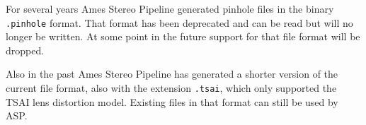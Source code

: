 For several years Ames Stereo Pipeline generated pinhole files in the binary \texttt{.pinhole} format.
That format has been deprecated and can be read but will no longer be written.  
At some point in the future support for that file format will be dropped.

Also in the past Ames Stereo Pipeline has generated a shorter version of the current file
format, also with the extension \texttt{.tsai}, which only supported the TSAI lens distortion model.
Existing files in that format can still be used by ASP.









